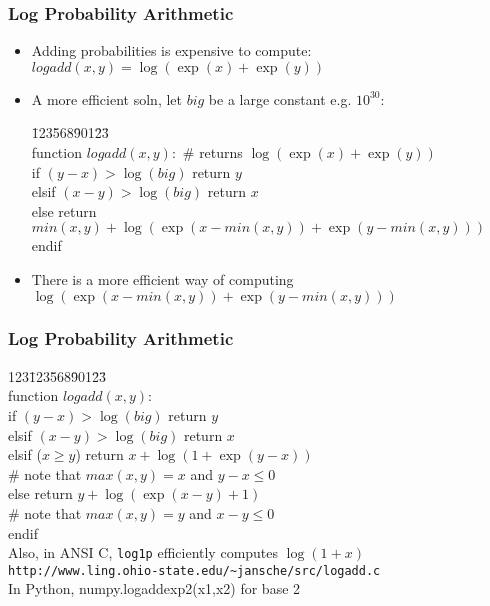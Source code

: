 \documentclass[handout]{beamer}
\begin{document}
\begin{frame}
\frametitle{Log Probability Arithmetic}
\begin{itemize}[<+->]
\item Adding probabilities is expensive to compute: $logadd(x,y) = \log(\exp(x) + \exp(y))$
\item A more efficient soln, let $big$ be a large constant e.g. $10^{30}$:
\begin{tabbing}
\=123\=568\=901\=23\=\kill \\
\textsf{function } $logadd(x,y):$ {\color{red} \# returns $\log(\exp(x) + \exp(y))$} \\
\>  \textsf{if } $(y - x) > \log(big)$ \color{blue} \textsf{return } $y$ \\
\>  \textsf{elsif  } $(x - y) > \log(big)$ \color{blue} \textsf{return } $x$ \\
\>  \textsf{else } \color{blue} \textsf{return } \\
\>\>\> \color{blue} $min(x, y) + \log(\exp(x - min(x,y)) + \exp(y -
min(x,y)))$ \\
\>  \textsf{endif }
\end{tabbing}
\item There is a more efficient way of computing $\log(\exp(x - 
min(x,y)) + \exp(y - min(x,y)))$
\end{itemize}

\end{frame}

\begin{frame}
\frametitle{Log Probability Arithmetic}
\begin{center}
\begin{tabbing}
123\=123\=568\=901\=23\=\kill \\
\textsf{function } $logadd(x,y):$ \\
\>  \textsf{if } $(y - x) > \log(big)$ \textsf{return } $y$ \\
\>  \textsf{elsif  } $(x - y) > \log(big)$ \textsf{return } $x$ \\
\>  \textsf{elsif ($x \geq y$)} \color{blue} return $x + \log(1 + \exp(y-x))$ \\
\>\> \color{red} \# {\small note that $max(x,y) = x$ and $y-x \leq 0$} \\
\> else \color{blue} return $y + \log(\exp(x-y) + 1)$ \\
\>\> \color{red} \# {\small note that $max(x,y) = y$ and $x-y \leq 0$} \\
\>  \textsf{endif } \\
\color{red} {\small Also, in ANSI C, {\tt log1p} efficiently computes $\log(1+x)$} \\
\color{red} {\footnotesize\tt http://www.ling.ohio-state.edu/\~{}jansche/src/logadd.c} \\
{\small In Python, numpy.logaddexp2(x1,x2) for base 2} 
\end{tabbing}
\end{center}

\end{frame}
\end{document}
